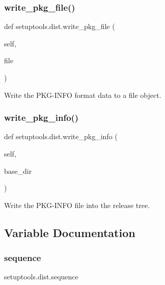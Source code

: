 \mbox{\label{namespacesetuptools_1_1dist_a37d5624a94cb0491805ecd6dddba85bc}} 
\subsubsection{\texorpdfstring{write\+\_\+pkg\+\_\+file()}{write\_pkg\_file()}}
{\footnotesize\ttfamily def setuptools.\+dist.\+write\+\_\+pkg\+\_\+file (\begin{DoxyParamCaption}\item[{}]{self,  }\item[{}]{file }\end{DoxyParamCaption})}

\begin{DoxyVerb}Write the PKG-INFO format data to a file object.
\end{DoxyVerb}
 \mbox{\label{namespacesetuptools_1_1dist_a7e266b8822f0a0702b118544cc667552}} 
\subsubsection{\texorpdfstring{write\+\_\+pkg\+\_\+info()}{write\_pkg\_info()}}
{\footnotesize\ttfamily def setuptools.\+dist.\+write\+\_\+pkg\+\_\+info (\begin{DoxyParamCaption}\item[{}]{self,  }\item[{}]{base\+\_\+dir }\end{DoxyParamCaption})}

\begin{DoxyVerb}Write the PKG-INFO file into the release tree.
\end{DoxyVerb}
 

\subsection{Variable Documentation}
\mbox{\label{namespacesetuptools_1_1dist_a990181c5330d133fd66d47c179a9395b}} 
\subsubsection{\texorpdfstring{sequence}{sequence}}
{\footnotesize\ttfamily setuptools.\+dist.\+sequence}

